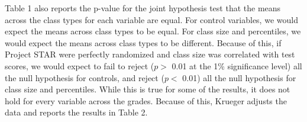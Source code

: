 \documentclass[a4paper,11pt]{article}
\begin{document}
Table 1 also reports the p-value for the joint hypothesis test that the means across the class types for each variable are equal. For control variables, we would expect the means across class types to be equal. For class size and percentiles, we would expect the means across class types to be different. Because of this, if Project STAR were perfectly randomized and class size was correlated with test scores, we would expect to fail to reject ($p >$ 0.01 at the 1\% significance level) all the null hypothesis for controls, and reject ($p <$ 0.01) all the null hypothesis for class size and percentiles. While this is true for some of the results, it does not hold for every variable across the grades. Because of this, Krueger adjusts the data and reports the results in Table 2. \par
\end{document}
